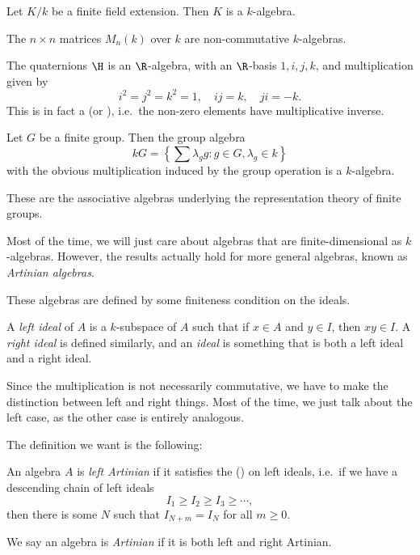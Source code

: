 \documentclass[a4paper]{article}
\begin{document}
\begin{eg}
  Let $K/k$ be a finite field extension. Then $K$ is a $k$-algebra.
\end{eg}

\begin{eg}
  The $n\times n$ matrices $M_n(k)$ over $k$ are non-commutative $k$-algebras.
\end{eg}

\begin{eg}
  The quaternions $\H$ is an $\R$-algebra, with an $\R$-basis $1, i, j, k$, and multiplication given by
  \[
    i^2 = j^2 = k^2 = 1,\quad ij = k,\quad ji = -k.
  \]
  This is in fact a  (or ), i.e.\ the non-zero elements have multiplicative inverse.
\end{eg}

\begin{eg}
  Let $G$ be a finite group. Then the group algebra
  \[
    kG = \left\{\sum \lambda_g g: g \in G, \lambda_g \in k\right\}
  \]
  with the obvious multiplication induced by the group operation is a $k$-algebra.

  These are the associative algebras underlying the representation theory of finite groups.
\end{eg}

Most of the time, we will just care about algebras that are finite-dimensional as $k$-algebras. However, the results actually hold for more general algebras, known as \emph{Artinian algebras}.

These algebras are defined by some finiteness condition on the ideals.

\begin{defi}[Ideal]
  A \emph{left ideal} of $A$ is a $k$-subspace of $A$ such that if $x \in A$ and $y \in I$, then $xy \in I$. A \emph{right ideal} is defined similarly, and an \emph{ideal} is something that is both a left ideal and a right ideal.
\end{defi}
Since the multiplication is not necessarily commutative, we have to make the distinction between left and right things. Most of the time, we just talk about the left case, as the other case is entirely analogous.

The definition we want is the following:
\begin{defi}
  An algebra $A$ is \emph{left Artinian} if it satisfies the  () on left ideals, i.e.\ if we have a descending chain of left ideals
  \[
    I_1 \geq I_2 \geq I_3 \geq \cdots,
  \]
  then there is some $N$ such that $I_{N + m} = I_{N}$ for all $m \geq 0$.

  We say an algebra is \emph{Artinian} if it is both left and right Artinian.
\end{defi}
\end{document}

